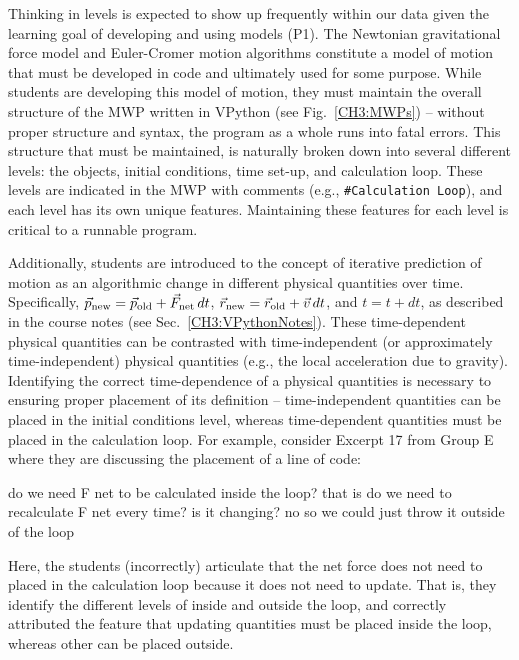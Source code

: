 \documentclass{msuphddissertation}
\begin{document}
\begin{doublespace}
Thinking in levels is expected to show up frequently within our data given the learning goal of developing and using models (P1).  The Newtonian gravitational force model and Euler-Cromer motion algorithms constitute a model of motion that must be developed in code and ultimately used for some purpose.  While students are developing this model of motion, they must maintain the overall structure of the MWP written in VPython (see Fig.~\ref{CH3:MWPs}) -- without proper structure and syntax, the program as a whole runs into fatal errors.  This structure that must be maintained, is naturally broken down into several different levels: the objects, initial conditions, time set-up, and calculation loop.  These levels are indicated in the MWP with comments (e.g., \texttt{\#Calculation Loop}), and each level has its own unique features.  Maintaining these features for each level is critical to a runnable program.

Additionally, students are introduced to the concept of iterative prediction of motion as an algorithmic change in different physical quantities over time.  Specifically, $\vec{p}_{\rm new} = \vec{p}_{\rm old} + \vec{F}_{\rm net}\,dt$, $\vec{r}_{\rm new} = \vec{r}_{\rm old} + \vec{v}\,dt$, and $t = t + dt$, as described in the course notes (see Sec.~\ref{CH3:VPythonNotes}).  These time-dependent physical quantities can be contrasted with time-independent (or approximately time-independent) physical quantities (e.g., the local acceleration due to gravity).  Identifying the correct time-dependence of a physical quantities is necessary to ensuring proper placement of its definition -- time-independent quantities can be placed in the initial conditions level, whereas time-dependent quantities must be placed in the calculation loop.  For example, consider Excerpt 17 from Group E where they are discussing the placement of a line of code:  \begin{description}
\SA do we need F net to be calculated inside the loop?
\SA that is do we need to recalculate F net every time? is it changing?
\SB no	
\SA so we could just throw it outside of the loop\end{description}  Here, the students (incorrectly) articulate that the net force does not need to placed in the calculation loop because it does not need to update.  That is, they identify the different levels of inside and outside the loop, and correctly attributed the feature that updating quantities must be placed inside the loop, whereas other can be placed outside.


\end{doublespace}
\end{document}
